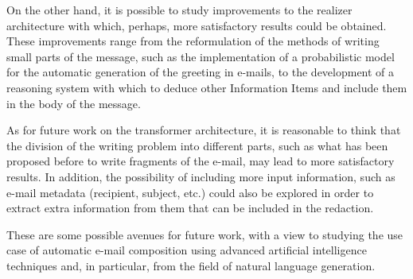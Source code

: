 On the other hand, it is possible to study improvements to the realizer architecture with which, perhaps, more satisfactory results could be obtained. These improvements range from the reformulation of the methods of writing small parts of the message, such as the implementation of a probabilistic model for the automatic generation of the greeting in e-mails, to the development of a reasoning system with which to deduce other Information Items and include them in the body of the message.

As for future work on the transformer architecture, it is reasonable to think that the division of the writing problem into different parts, such as what has been proposed before to write fragments of the e-mail, may lead to more satisfactory results. In addition, the possibility of including more input information, such as e-mail metadata (recipient, subject, etc.) could also be explored in order to extract extra information from them that can be included in the redaction.

These are some possible avenues for future work, with a view to studying the use case of automatic e-mail composition using advanced artificial intelligence techniques and, in particular, from the field of natural language generation.


